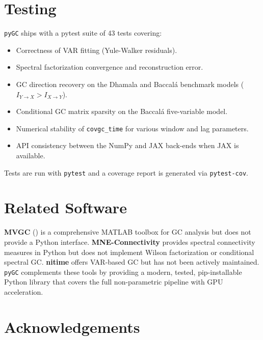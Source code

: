 \documentclass[10pt,a4paper,onecolumn]{article}
\providecommand{\tightlist}{%
  \setlength{\itemsep}{0pt}\setlength{\parskip}{0pt}}
\begin{document}
\section{Testing}\label{testing}

\texttt{pyGC} ships with a pytest suite of 43 tests covering:

\begin{itemize}
\tightlist
\item Correctness of VAR fitting (Yule-Walker residuals).
\item Spectral factorization convergence and reconstruction error.
\item GC direction recovery on the Dhamala and Baccalá benchmark
  models (\(I_{Y \to X} > I_{X \to Y}\)).
\item Conditional GC matrix sparsity on the Baccalá five-variable
  model.
\item Numerical stability of \texttt{covgc\_time} for various window
  and lag parameters.
\item API consistency between the NumPy and JAX back-ends when JAX is
  available.
\end{itemize}

Tests are run with \texttt{pytest} and a coverage report is generated
via \texttt{pytest-cov}.

\section{Related Software}\label{related-software}

\textbf{MVGC} () is a
comprehensive MATLAB toolbox for GC analysis but does not provide a
Python interface. \textbf{MNE-Connectivity} provides spectral
connectivity measures in Python but does not implement Wilson
factorization or conditional spectral GC. \textbf{nitime} offers
VAR-based GC but has not been actively maintained. \texttt{pyGC}
complements these tools by providing a modern, tested, pip-installable
Python library that covers the full non-parametric pipeline with GPU
acceleration.

\section*{Acknowledgements}\label{acknowledgements}
\end{document}
